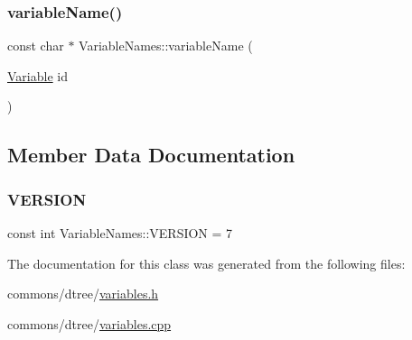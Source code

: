 \mbox{\label{classdtree_1_1_variable_names_a3fd22144a6f569e4c5c342bf44e84a50}} 
\subsubsection{\texorpdfstring{variableName()}{variableName()}}
{\footnotesize\ttfamily const char $\ast$ Variable\+Names\+::variable\+Name (\begin{DoxyParamCaption}\item[{\mbox{\hyperlink{namespacedtree_a79fe30831a14df904319f9e783b3189b}{Variable}}}]{id }\end{DoxyParamCaption})\hspace{0.3cm}{\ttfamily [static]}}



\subsection{Member Data Documentation}
\mbox{\label{classdtree_1_1_variable_names_a8dbf2bca55b63f43dc189bcee9add901}} 
\subsubsection{\texorpdfstring{VERSION}{VERSION}}
{\footnotesize\ttfamily const int Variable\+Names\+::\+V\+E\+R\+S\+I\+ON = 7\hspace{0.3cm}{\ttfamily [static]}}



The documentation for this class was generated from the following files\+:\begin{DoxyCompactItemize}
\item 
commons/dtree/\mbox{\hyperlink{variables_8h}{variables.\+h}}\item 
commons/dtree/\mbox{\hyperlink{variables_8cpp}{variables.\+cpp}}\end{DoxyCompactItemize}
